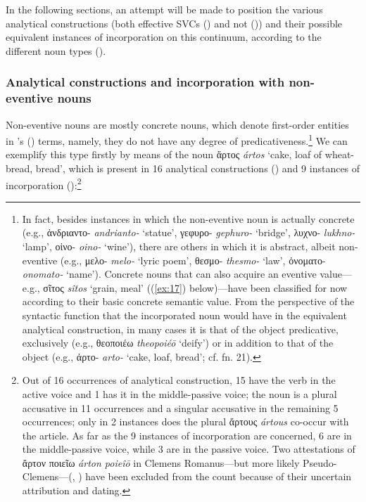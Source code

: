 \documentclass[output=paper,colorlinks,citecolor=brown]{langscibook}
\begin{document}
In the following sections, an attempt will be made to position the various analytical constructions (both effective SVCs () and not ()) and their possible equivalent instances of incorporation on this continuum, according to the different noun types ().

\subsubsection{Analytical constructions and incorporation with non-eventive nouns}\label{Section3/2/1}

Non-eventive nouns are mostly concrete nouns, which denote first-order entities in \citeauthor{Lyons1977}'s (\citeyear[443]{Lyons1977}) terms, namely, they do not have any degree of predicativeness.\footnote{In fact, besides instances in which the non-eventive noun is actually concrete (e.g., ἀνδριαντο- \textit{andrianto-} `statue', γεφυρο- \textit{gephuro-} `bridge', λυχνο- \textit{lukhno-} `lamp', οἰνο- \textit{oino-} `wine'), there are others in which it is abstract, albeit non-eventive (e.g., μελο- \textit{melo-} `lyric poem', θεσμο- \textit{thesmo-} `law', ὀνοματο- \textit{onomato-} `name'). Concrete nouns that can also acquire an eventive value---e.g., σῖτος \textit{sîtos} `grain, meal' ((\ref{ex:17}) below)---have been classified for now according to their basic concrete semantic value. From the perspective of the syntactic function that the incorporated noun would have in the equivalent analytical construction, in many cases it is that of the object predicative, exclusively (e.g., θεοποιέω \textit{theopoiéō} `deify') or in addition to that of the object (e.g., ἀρτο- \textit{arto-} `cake, loaf, bread'; cf. fn. 21).} We can exemplify this type firstly by means of the noun ἄρτος \textit{ártos} `cake, loaf of wheat-bread, bread', which is present in 16 analytical constructions () and 9 instances of incorporation ():\footnote{Out of 16 occurrences of analytical construction, 15 have the verb in the active voice and 1 has it in the middle-passive voice; the noun is a plural accusative in 11 occurrences and a singular accusative in the remaining 5 occurrences; only in 2 instances does the plural ἄρτους \textit{ártous} co-occur with the article. As far as the 9 instances of incorporation are concerned, 6 are in the middle-passive voice, while 3 are in the passive voice. Two attestations of ἄρτον ποιεῖω \textit{árton poieîō} in Clemens Romanus---but more likely Pseudo-Clemens---(, ) have been excluded from the count because of their uncertain attribution and dating.}
\end{document}
